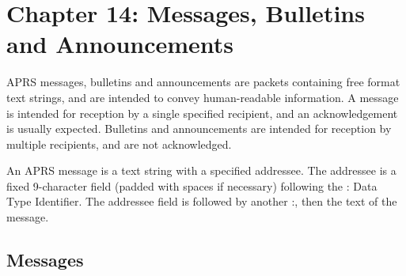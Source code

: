 \chapter{Chapter 14: Messages, Bulletins and Announcements}


APRS messages, bulletins and announcements are packets containing free
format text strings, and are intended to convey human-readable information.
A message is intended for reception by a single specified recipient, and an
acknowledgement is usually expected. Bulletins and announcements are
intended for reception by multiple recipients, and are not acknowledged.

An APRS message is a text string with a specified addressee. The addressee
is a fixed 9-character field (padded with spaces if necessary) following the :
Data Type Identifier. The addressee field is followed by another :, then the
text of the message.

\section{Messages}

